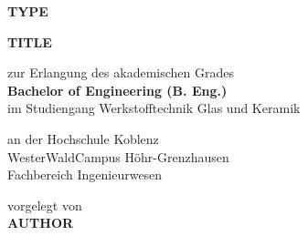{\begin{figure}
\begin{subfigure}{0.45\textwidth}
  \end{subfigure}
\end{figure}

\begin{center}


\vspace{3cm}
{\large \textbf{TYPE}}

\vspace{0.5cm}
\parbox{0.7\textwidth}{
  \begin{center}
    \huge \textbf{TITLE}
  \end{center}
}


\vspace{3cm}
\parbox{0.7\textwidth}{
  \begin{center}
    zur Erlangung des akademischen Grades\\
    \textbf{Bachelor of Engineering (B. Eng.)}\\
    im Studiengang Werkstofftechnik Glas und Keramik\\
  \end{center}
}

\vspace{1cm}
\parbox{0.7\textwidth}{
  \begin{center}
    an der Hochschule Koblenz\\
    WesterWaldCampus H\"ohr-Grenzhausen\\
    Fachbereich Ingenieurwesen
  \end{center}
}


\vfill
{\fontsize{12}{12} \selectfont
  vorgelegt von\\
  \textbf{AUTHOR}
}\\
\vspace{1cm}


\end{center}}
